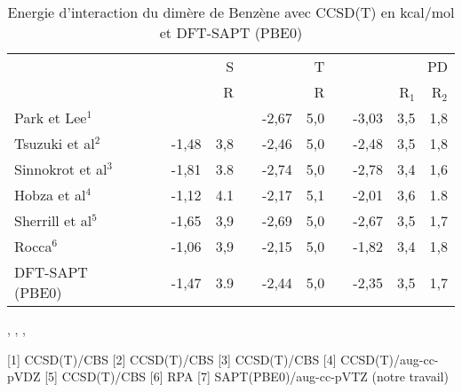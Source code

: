 	\begin{table}[H]
		\caption{Energie d'interaction du dimère de Benzène avec CCSD(T) en kcal/mol et DFT-SAPT (PBE0)}
		\begin{center}
			\begin{tabular}{l c r r r c r r c r r r}
				\toprule
				& & & \multicolumn{2}{p{2cm}}{\centering S}  &	& \multicolumn{2}{p{2cm}}{\centering
					T}& &\multicolumn{3}{p{3cm}}{\centering PD}\\
				\cline{4-12}
				& & & & R & &  &  R & & & R$_{1}$ & R$_{2}$ \\
				\midrule
				Park et Lee$^{1}$ & & & &  & &-2,67& 5,0 & &-3,03 & 3,5 & 1,8\\
				Tsuzuki et al$^{2}$ & & & -1,48& 3,8 &  &-2,46& 5,0&  & -2,48 & 3,5& 1,8\\
				Sinnokrot et al$^{3}$ & & & -1,81 & 3.8 & &-2,74& 5,0&  & -2,78 & 3,4 & 1,6\\
				Hobza et al$^{4}$ & & &-1,12 & 4.1 &  &-2,17& 5,1& & -2,01 & 3,6 & 1.8\\
				Sherrill et al$^{5}$& &  & -1,65 & 3,9 & & -2,69& 5,0 & & -2,67 & 3,5 & 1,7 \\
				Rocca$^{6}$ & & & -1,06& 3,9& & -2,15& 5,0 & & -1,82 & 3,4 & 1,8\\ 
				DFT-SAPT (PBE0) & & & -1,47 & 3.9 &  &-2,44 &5,0& & -2,35& 3,5 &1,7\\
				\bottomrule
			\end{tabular}
		\end{center}
		\centering
		,
		,
		,
		
		[1] CCSD(T)/CBS
		[2] CCSD(T)/CBS 
		[3] CCSD(T)/CBS
		[4] CCSD(T)/aug-cc-pVDZ
		[5] CCSD(T)/CBS 
		[6] RPA
		[7] SAPT(PBE0)/aug-cc-pVTZ (notre travail)
		
		\label{benzene}
	\end{table}
	
	
	
	
	
	
	
	
	
	
	
	\newpage

